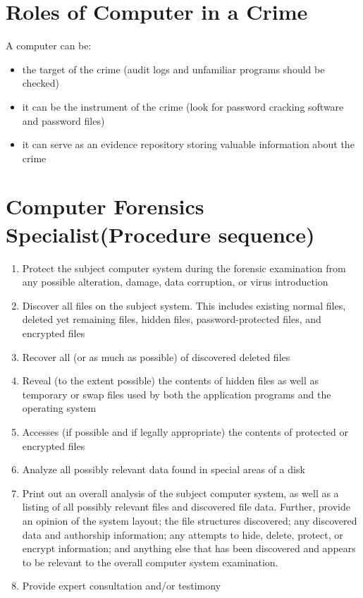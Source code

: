 \documentclass{scrreprt}
\begin{document}
\section{Roles of Computer in a Crime}
A computer can be:
\begin{itemize}
\item the target of the crime (audit logs and unfamiliar programs should be checked)
\item it can be the instrument of the crime (look for password cracking software and password files)
\item it can serve as an evidence repository storing valuable information about the crime
\end{itemize}

\section{Computer Forensics Specialist(Procedure sequence)}
\begin{enumerate}
\item Protect the subject computer system during the forensic examination from any possible alteration, damage, data corruption, or virus introduction
\item  Discover all files on the subject system. This includes existing normal files, deleted yet remaining files, hidden files, password-protected files, and encrypted files
\item Recover all (or as much as possible) of discovered deleted files
\item Reveal (to the extent possible) the contents of hidden files as well as temporary or swap files used by both the application programs and the operating system
\item Accesses (if possible and if legally appropriate) the contents of protected or encrypted files
\item Analyze all possibly relevant data found in special areas of a disk
\item Print out an overall analysis of the subject computer system, as well as a listing of all possibly relevant files and discovered file data. Further, provide an opinion of the system layout; the file structures discovered; any discovered data and authorship information; any attempts to hide, delete, protect, or encrypt information; and anything else that has been discovered and appears to be relevant to the overall computer system examination.
\item Provide expert consultation and/or testimony
\end{enumerate}
\end{document}
